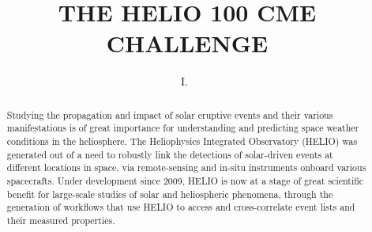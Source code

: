 \documentclass[namedreferences]{SolarPhysics}
\begin{document}
\begin{article}

\begin{opening}

\title{THE HELIO 100 CME CHALLENGE}

%
\author{I.~\surname{}%
       }

%


%


\begin{abstract}

Studying the propagation and impact of solar eruptive events and their various manifestations is of great importance for understanding and predicting space weather conditions in the heliosphere. The Heliophysics Integrated Observatory (HELIO) was generated out of a need to robustly link the detections of solar-driven events at different locations in space, via remote-sensing and in-situ instruments onboard various spacecrafts. Under development since 2009, HELIO is now at a stage of great scientific benefit for large-scale studies of solar and heliospheric phenomena, through the generation of workflows that use HELIO to access and cross-correlate event lists and their measured properties.




\end{abstract}
\end{opening}
\end{article}
\end{document}
